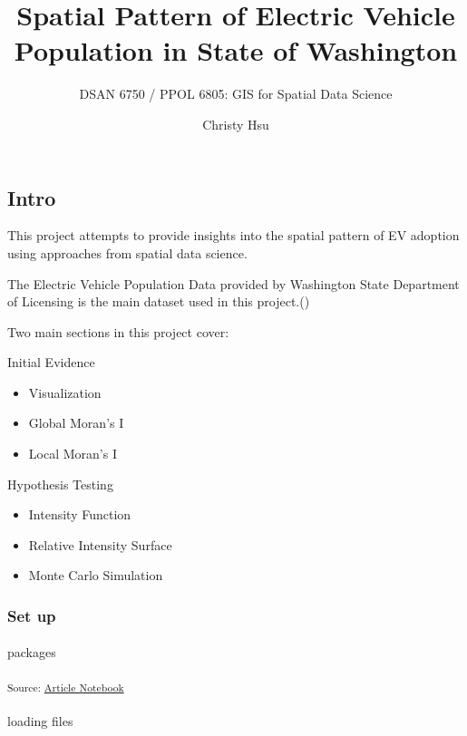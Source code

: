 \documentclass[
  letterpaper,
  DIV=11,
  numbers=noendperiod]{scrartcl}
\title{Spatial Pattern of Electric Vehicle Population in State of
Washington}
\subtitle{DSAN 6750 / PPOL 6805: GIS for Spatial Data Science}
\author{Christy Hsu}
\date{}
\makeatletter
\let\oldparagraph\paragraph
\renewcommand{\paragraph}{
    \@ifstar
      \xxxParagraphStar
      \xxxParagraphNoStar
  }
\newcommand{\xxxParagraphStar}[1]{\oldparagraph*{#1}\mbox{}}
\newcommand{\xxxParagraphNoStar}[1]{\oldparagraph{#1}\mbox{}}
\providecommand{\tightlist}{%
  \setlength{\itemsep}{0pt}\setlength{\parskip}{0pt}}\usepackage{longtable,booktabs,array}
\makeatother
\begin{document}
\maketitle


\subsection{Intro}\label{intro}

This project attempts to provide insights into the spatial pattern of EV
adoption using approaches from spatial data science.

The Electric Vehicle Population Data provided by Washington State
Department of Licensing is the main dataset used in this
project.()

Two main sections in this project cover:

Initial Evidence

\begin{itemize}
\tightlist
\item
  Visualization
\item
  Global Moran's I
\item
  Local Moran's I
\end{itemize}

Hypothesis Testing

\begin{itemize}
\tightlist
\item
  Intensity Function
\item
  Relative Intensity Surface
\item
  Monte Carlo Simulation
\end{itemize}

\subsubsection{Set up}\label{set-up}

\paragraph{packages}\label{packages}

\textsubscript{Source:
\href{https://h-christy.github.io/24-manuscript/index.qmd.html}{Article
Notebook}}

\paragraph{loading files}\label{loading-files}
\end{document}
